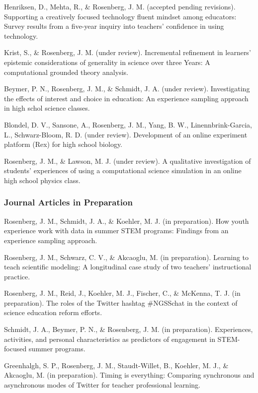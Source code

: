 \documentclass[]{article}
\begin{document}
Henriksen, D., Mehta, R., \& Rosenberg, J. M. (accepted pending
revisions). Supporting a creatively focused technology fluent mindset
among educators: Survey results from a five-year inquiry into teachers'
confidence in using technology.

Krist, S., \& Rosenberg, J. M. (under review). Incremental refinement in
learners' epistemic considerations of generality in science over three
Years: A computational grounded theory analysis.

Beymer, P. N., Rosenberg, J. M., \& Schmidt, J. A. (under review).
Investigating the effects of interest and choice in education: An
experience sampling approach in high schol science classes.

Blondel, D. V., Sansone, A., Rosenberg, J. M., Yang, B. W.,
Linennbrink-Garcia, L., Schwarz-Bloom, R. D. (under review). Development
of an online experiment platform (Rex) for high school biology.

Rosenberg, J. M., \& Lawson, M. J. (under review). A qualitative
investigation of students' experiences of using a computational science
simulation in an online high school physics class.

\subsubsection{Journal Articles in
Preparation}\label{journal-articles-in-preparation}

Rosenberg, J. M., Schmidt, J. A., \& Koehler, M. J. (in preparation).
How youth experience work with data in summer STEM programs: Findings
from an experience sampling approach.

Rosenberg, J. M., Schwarz, C. V., \& Akcaoglu, M. (in preparation).
Learning to teach scientific modeling: A longitudinal case study of two
teachers' instructional practice.

Rosenberg, J. M., Reid, J., Koehler, M. J., Fischer, C., \& McKenna, T.
J. (in preparation). The roles of the Twitter hashtag \#NGSSchat in the
context of science education reform efforts.

Schmidt, J. A., Beymer, P. N., \& Rosenberg, J. M. (in preparation).
Experiences, activities, and personal characteristics as predictors of
engagement in STEM-focused summer programs.

Greenhalgh, S. P., Rosenberg, J. M., Staudt-Willet, B., Koehler, M. J.,
\& Akcaoglu, M. (in preparation). Timing is everything: Comparing
synchronous and asynchronous modes of Twitter for teacher professional
learning.
\end{document}
